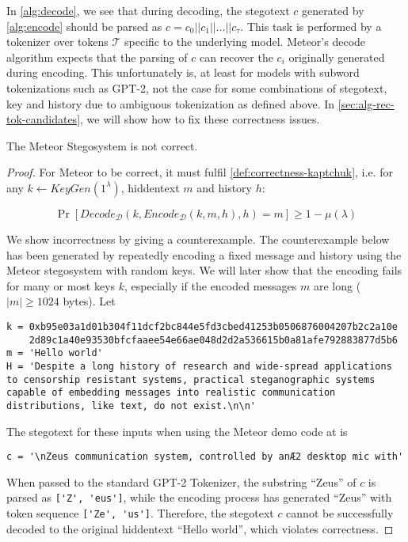 In \autoref{alg:decode}, we see that during decoding, the stegotext $c$ generated by \autoref{alg:encode} should be parsed as $c = c_0 ||c_1 || \dots || c_{\tau}$.
This task is performed by a tokenizer over tokens $\mathcal{T}$ specific to the underlying model.
Meteor's decode algorithm expects that the parsing of $c$ can recover the $c_i$ originally generated during encoding.
This unfortunately is, at least for models with subword tokenizations such as GPT-2, not the case for some combinations of stegotext, key and history due to ambiguous tokenization as defined above.
In \autoref{sec:alg-rec-tok-candidates}, we will show how to fix these correctness issues.

\begin{theorem}
The Meteor Stegosystem is not correct.
\end{theorem}

\begin{proof}
For Meteor to be correct, it must fulfil \autoref{def:correctness-kaptchuk}, i.e. for any $k \leftarrow KeyGen(1^\lambda)$, hiddentext $m$ and history $h$:

$$\mathop{Pr}[Decode_{\mathcal{D}}(k, Encode_{\mathcal{D}}(k, m, h), h) = m] \geq 1 - \mu(\lambda)$$

We show incorrectness by giving a counterexample. 
The counterexample below has been generated by repeatedly encoding a fixed message and history using the Meteor stegosystem with random keys.
We will later show that the encoding fails for many or most keys $k$, especially if the encoded messages $m$ are long ($|m| \geq 1024$ bytes).
Let

\begin{lstlisting}[breaklines]
k = 0xb95e03a1d01b304f11dcf2bc844e5fd3cbed41253b0506876004207b2c2a10e
    2d89c1a40e93530bfcfaaee54e66ae048d2d2a536615b0a81afe792883877d5b6
m = 'Hello world'
H = 'Despite a long history of research and wide-spread applications to censorship resistant systems, practical steganographic systems capable of embedding messages into realistic communication distributions, like text, do not exist.\n\n'
\end{lstlisting}

The stegotext for these inputs when using the Meteor demo code at \cite{MeteorDemo2021} is

\begin{lstlisting}
c = '\nZeus communication system, controlled by anÆ2 desktop mic with'
\end{lstlisting}

When passed to the standard GPT-2 Tokenizer, the substring ``Zeus'' of $c$ is parsed as \lstinline{['Z', 'eus']}, while the encoding process has generated ``Zeus'' with token sequence \lstinline{['Ze', 'us']}.
Therefore, the stegotext $c$ cannot be successfully decoded to the original hiddentext ``Hello world'', which violates correctness.
\end{proof}

